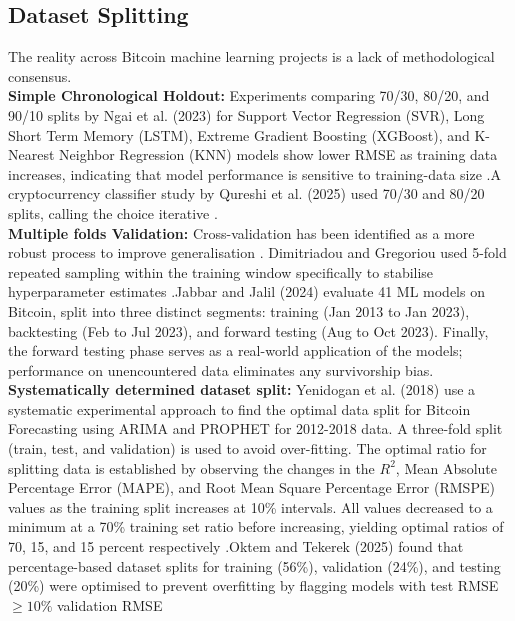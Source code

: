 \subsection{Dataset Splitting}
The reality across Bitcoin machine learning projects is a lack of methodological consensus.\\
\textbf{Simple Chronological Holdout:} Experiments comparing 70/30, 80/20, and 90/10 splits by Ngai et al. (2023) for Support Vector Regression (SVR), Long Short Term Memory (LSTM), Extreme Gradient Boosting (XGBoost), and K-Nearest Neighbor Regression (KNN) models show lower RMSE as training data increases, indicating that model performance is sensitive to training-data size \cite{eddiengaiTimeSeriesPrediction2023}.A cryptocurrency classifier study by Qureshi et al. (2025) used 70/30 and 80/20 splits, calling the choice iterative \cite{qureshiEvaluatingMachineLearning2025}.\\
\textbf{Multiple folds Validation:} Cross-validation has been identified as a more robust process to improve generalisation \cite{dimitriadouPredictingBitcoinPrices2023}. Dimitriadou and Gregoriou used 5-fold repeated sampling within the training window specifically to stabilise hyperparameter estimates \cite{dimitriadouPredictingBitcoinPrices2023}.Jabbar and Jalil (2024) evaluate 41 ML models on Bitcoin, split into three distinct segments: training (Jan 2013 to Jan 2023), backtesting (Feb to Jul 2023), and forward testing (Aug to Oct 2023). Finally, the forward testing phase serves as a real-world application of the models; performance on unencountered data eliminates any survivorship bias. \\
\textbf{Systematically determined dataset split:} Yenidogan et al. (2018) use a systematic experimental approach to find the optimal data split for Bitcoin Forecasting using ARIMA and PROPHET for 2012-2018 data. A three-fold split (train, test, and validation) is used to avoid over-fitting. The optimal ratio for splitting data is established by observing the changes in the $R^2$, Mean Absolute Percentage Error (MAPE), and Root Mean Square Percentage Error (RMSPE) values as the training split increases at 10\% intervals. All values decreased to a minimum at a 70\% training set ratio before increasing, yielding optimal ratios of 70, 15, and 15 percent respectively \cite{yenidoganBitcoinForecastingUsing2018}.Oktem and Tekerek (2025) found that percentage-based dataset splits for training (56\%), validation (24\%), and testing (20\%) were optimised to prevent overfitting by flagging models with test RMSE $\geq 10\%$ validation RMSE  \cite{oktemBitcoinPriceDirection2025}
